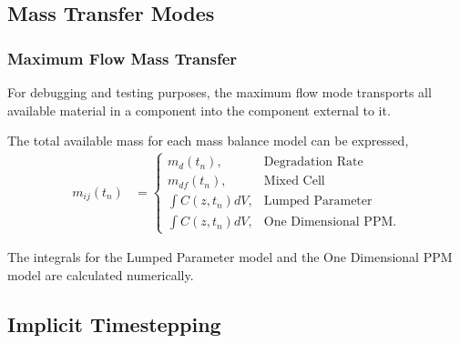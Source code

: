 \subsection{Mass Transfer Modes}\label{sec:mass_transfer}






\subsubsection{Maximum Flow Mass Transfer}\label{sed:max_flow_mass_transfer}

For debugging and testing purposes, the maximum flow mode transports all 
available material in a component into the component external to it. 

The total available mass for each mass balance model can be expressed,
\begin{align}
m_{ij}(t_n) &= \begin{cases}
                         m_{d}(t_n), & \mbox{Degradation Rate}\\
                         m_{df}(t_n), & \mbox{Mixed Cell}\\
                         \int C(z,t_n)dV, & \mbox{Lumped Parameter}\\
                         \int C(z,t_n)dV, & \mbox{One Dimensional PPM}.
               \end{cases}
\end{align}

The integrals for the Lumped Parameter model and the One Dimensional PPM model 
are calculated numerically.

\subsection{Implicit Timestepping}\label{sec:timestepping}


